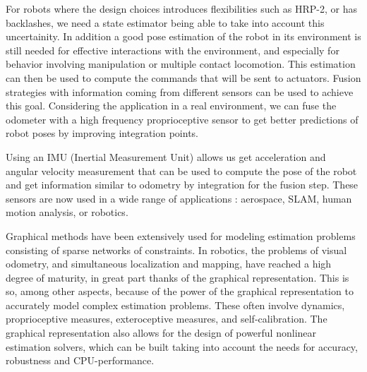 For robots where the design choices introduces flexibilities such as HRP-2, or has backlashes,
we need a state estimator being able to take into account this uncertainity.
In addition a good pose estimation of the robot in its environment is still needed for effective interactions with the environment,
and especially for behavior involving manipulation or multiple contact locomotion.
This estimation can then be used to compute the commands that will be sent to actuators.
Fusion strategies with information coming from different sensors can be used to achieve this goal. 
Considering the application in a real environment, we can fuse the odometer with a high frequency proprioceptive sensor 
to get better predictions of robot poses by improving integration points.

Using an IMU (Inertial Measurement Unit) allows us get acceleration and angular velocity measurement that can be used to 
compute the pose of the robot and get information similar to odometry by integration for the fusion step.
These sensors are now used in a wide range of applications : aerospace, SLAM, human motion analysis, or robotics.





Graphical methods have been extensively used for modeling estimation problems consisting of sparse networks of constraints. 
In robotics, the problems of visual odometry, and simultaneous localization and mapping, have reached a high degree of maturity, in great part thanks of the graphical representation. 
This is so, among other aspects, because of the power of the graphical representation to accurately model complex estimation problems. 
These often involve dynamics, proprioceptive measures, exteroceptive measures, and self-calibration. 
The graphical representation also allows for the design of powerful nonlinear estimation solvers, which can be built taking into account the needs for accuracy, robustness and CPU-performance.
